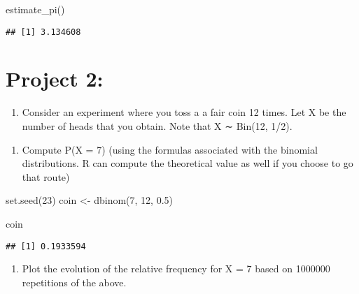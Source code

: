 \documentclass[
]{article}
\newenvironment{Shaded}{\begin{snugshade}}{\end{snugshade}}
\newcommand{\DecValTok}[1]{\textcolor[rgb]{0.00,0.00,0.81}{#1}}
\newcommand{\FloatTok}[1]{\textcolor[rgb]{0.00,0.00,0.81}{#1}}
\newcommand{\FunctionTok}[1]{\textcolor[rgb]{0.00,0.00,0.00}{#1}}
\newcommand{\NormalTok}[1]{#1}
\newcommand{\OtherTok}[1]{\textcolor[rgb]{0.56,0.35,0.01}{#1}}
\providecommand{\tightlist}{%
  \setlength{\itemsep}{0pt}\setlength{\parskip}{0pt}}
\begin{document}
\begin{Shaded}
\begin{Highlighting}[]
\FunctionTok{estimate\_pi}\NormalTok{()}
\end{Highlighting}
\end{Shaded}

\begin{verbatim}
## [1] 3.134608
\end{verbatim}

\hypertarget{project-2}{%
\section{Project 2:}\label{project-2}}

\begin{enumerate}
\def\labelenumi{\arabic{enumi}.}
\tightlist
\item
  Consider an experiment where you toss a a fair coin 12 times. Let X be
  the number of heads that you obtain. Note that X ∼ Bin(12, 1/2).
\end{enumerate}

\begin{enumerate}
\def\labelenumi{(\alph{enumi})}
\tightlist
\item
  Compute P(X = 7) (using the formulas associated with the binomial
  distributions. R can compute the theoretical value as well if you
  choose to go that route)
\end{enumerate}

\begin{Shaded}
\begin{Highlighting}[]
\FunctionTok{set.seed}\NormalTok{(}\DecValTok{23}\NormalTok{)}
\NormalTok{coin }\OtherTok{\textless{}{-}} \FunctionTok{dbinom}\NormalTok{(}\DecValTok{7}\NormalTok{, }\DecValTok{12}\NormalTok{, }\FloatTok{0.5}\NormalTok{)}

\NormalTok{coin}
\end{Highlighting}
\end{Shaded}

\begin{verbatim}
## [1] 0.1933594
\end{verbatim}

\begin{enumerate}
\def\labelenumi{(\alph{enumi})}
\setcounter{enumi}{1}
\tightlist
\item
  Plot the evolution of the relative frequency for X = 7 based on
  1000000 repetitions of the above.
\end{enumerate}
\end{document}
